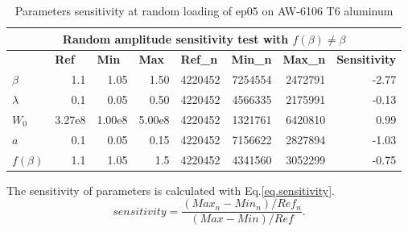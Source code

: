 \documentclass[3p,times,number,review]{elsarticle}
\begin{document}
\begin{table}[!h]
	\centering
\begin{tabular}{lrrrrrrr}
	\hline
	\multicolumn{8}{c}{\textbf{Random amplitude sensitivity test with $f(\beta)\neq\beta$}}                                                                                                                                                                                                   \\ \hline
	\textbf{}           & \multicolumn{1}{l}{\textbf{Ref}} & \multicolumn{1}{l}{\textbf{Min}} & \multicolumn{1}{l}{\textbf{Max}} & \multicolumn{1}{l}{\textbf{Ref\_n}} & \multicolumn{1}{l}{\textbf{Min\_n}} & \multicolumn{1}{l}{\textbf{Max\_n}} & \multicolumn{1}{l}{\textbf{Sensitivity}} \\ \hline
	\textbf{$\beta$}    & 1.1                              & 1.05                             & 1.50                             & 4220452                             & 7254554                             & 2472791                             & -2.77                                    \\
	\textbf{$\lambda$}  & 0.1                              & 0.05                             & 0.50                             & 4220452                             & 4566335                             & 2175991                             & -0.13                                    \\
	\textbf{$W_0$}      & 3.27e8                         & 1.00e8                         & 5.00e8                         & 4220452                             & 1321761                             & 6420810                             & 0.99                                     \\
	\textbf{$a$}        & 0.1                              & 0.05                             & 0.15                             & 4220452                             & 7156622                             & 2827894                             & -1.03                                    \\
	\textbf{$f(\beta)$} & 1.1                              & 1.05                             & 1.5                              & 4220452                             & 4341560                             & 3052299                             & -0.75                                    \\ \hline
\end{tabular}
	\caption{Parameters sensitivity at random loading of ep05 on AW-6106 T6 aluminum}
	\label{tab.sensitivity_random2}
\end{table}
The sensitivity of parameters is calculated with Eq.\eqref{eq.sensitivity}.
\begin{equation}
sensitivity = \dfrac{\left( Max_n-Min_n\right)/Ref_n}{\left( Max-Min\right)/Ref}.
\label{eq.sensitivity}
\end{equation}
\end{document}

